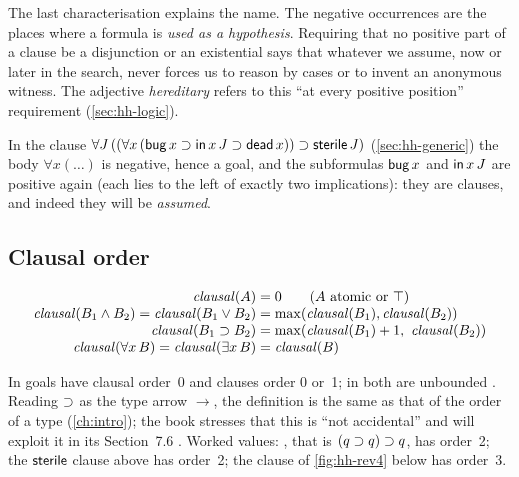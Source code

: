 {The last characterisation explains the name. The negative occurrences are the places where a formula
is \emph{used as a hypothesis}. Requiring that no positive part of a clause be a disjunction or an
existential says that whatever we assume, now or later in the search, never forces us to reason by cases
or to invent an anonymous witness. The adjective \emph{hereditary} refers to this
``at every positive position'' requirement (\cref{sec:hh-logic}).

\begin{example}
In the clause $\forall J\,((\forall x\,(\mathsf{bug}\,x\supset\mathsf{in}\,x\,J\supset\mathsf{dead}\,x))\supset
\mathsf{sterile}\,J)$ (\cref{sec:hh-generic}) the body $\forall x(\dots)$ is negative, hence a goal, and the
subformulas $\mathsf{bug}\,x$ and $\mathsf{in}\,x\,J$ are positive again (each lies to the left of exactly two
implications): they are clauses, and indeed they will be \emph{assumed}.
\end{example}

\subsection{Clausal order}

\begin{definition}\label{def:hh-clausal}
\[
\begin{array}{r@{\;=\;}l}
\mathit{clausal}(A) & 0 \qquad (A\text{ atomic or }\top)\\
\mathit{clausal}(B_1\wedge B_2) = \mathit{clausal}(B_1\vee B_2) & \max(\mathit{clausal}(B_1),\mathit{clausal}(B_2))\\
\mathit{clausal}(B_1\imp B_2) & \max(\mathit{clausal}(B_1)+1,\ \mathit{clausal}(B_2))\\
\mathit{clausal}(\forall x\,B) = \mathit{clausal}(\exists x\,B) & \mathit{clausal}(B)
\end{array}
\]
\end{definition}

In \fohc{} goals have clausal order~0 and clauses order 0 or~1; in \fohh{} both are unbounded .
Reading $\supset$ as the type arrow $\to$, the definition is the same as that of the order of a type
(\cref{ch:intro}); the book stresses that this is ``not accidental'' and will exploit it in its
Section~7.6 . Worked values: , that is $(q\supset q)\supset q$,
has order~2; the $\mathsf{sterile}$ clause above has order~2; the clause of \cref{fig:hh-rev4} below has
order~3.

}
